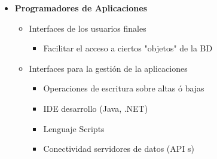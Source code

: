 \documentclass[12pt, fleqn]{report}                             %
\begin{document}
\begin{itemize}
                \item
                    \textbf{Programadores de Aplicaciones}

                    \begin{itemize}
                        \item Interfaces de los usuarios finales
                        \begin{itemize}
                            \item Facilitar el acceso a ciertos "objetos" de la BD
                        \end{itemize}

                        \item Interfaces para la gestión de la aplicaciones 
                        \begin{itemize}
                            \item Operaciones de escritura sobre altas ó bajas 
                            \item IDE desarrollo (Java, .NET)
                            \item Lenguaje Scripts
                            \item Conectividad servidores de datos (API s) 
                        \end{itemize}
        
                    \end{itemize}


            \end{itemize}

            \clearpage
\end{document}
